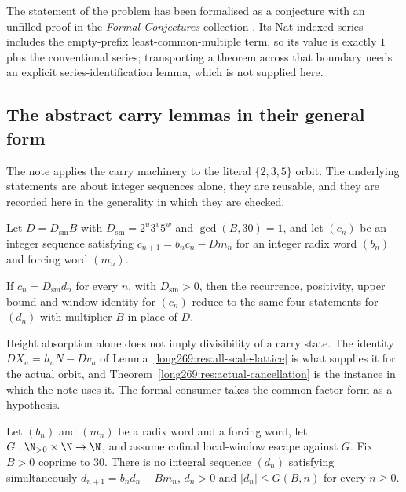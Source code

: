 The statement of the problem has been formalised as a conjecture with an
unfilled proof in the \emph{Formal Conjectures} collection
\cite{formalconjectures269}.  Its Nat-indexed series includes the empty-prefix
least-common-multiple term, so its value is exactly \(1\) plus the conventional
series; transporting a theorem across that boundary needs an
explicit series-identification lemma, which is not supplied here.

\subsection{The abstract carry lemmas in their general form}
\label{long269:long:general-carries}

The note applies the carry machinery to the literal $\{2,3,5\}$ orbit.  The
underlying statements are about integer sequences alone, they are reusable, and
they are recorded here in the generality in which they are checked.

Let $D=D_{\mathrm{sm}}B$ with $D_{\mathrm{sm}}=2^{u}3^{v}5^{w}$ and
$\gcd(B,30)=1$, and let $(c_n)$ be an integer sequence satisfying
$c_{n+1}=b_nc_n-Dm_n$ for an integer radix word $(b_n)$ and forcing word
$(m_n)$.

\begin{proposition}
\label{long269:long:denominator-reduction}
If $c_n=D_{\mathrm{sm}}d_n$ for every $n$, with $D_{\mathrm{sm}}>0$, then the
recurrence, positivity, upper bound and window identity for $(c_n)$ reduce to
the same four statements for $(d_n)$ with multiplier $B$ in place of $D$.
\end{proposition}

Height absorption alone does not imply divisibility of a carry state.  The
identity $DX_a=h_aN-Dv_a$ of Lemma~\ref{long269:res:all-scale-lattice} is what supplies
it for the actual orbit, and Theorem~\ref{long269:res:actual-cancellation} is the
instance in which the note uses it.  The formal consumer takes the
common-factor form as a hypothesis.

\begin{proposition}
\label{long269:long:windowconsumer}
Let $(b_n)$ and $(m_n)$ be a radix word and a forcing word, let
$G:\N_{>0}\times\N\to\N$, and assume cofinal local-window escape against $G$.
Fix $B>0$ coprime to $30$.  There is no integral sequence $(d_n)$ satisfying
simultaneously $d_{n+1}=b_nd_n-Bm_n$, $d_n>0$ and $|d_n|\le G(B,n)$ for every
$n\ge0$.
\end{proposition}


